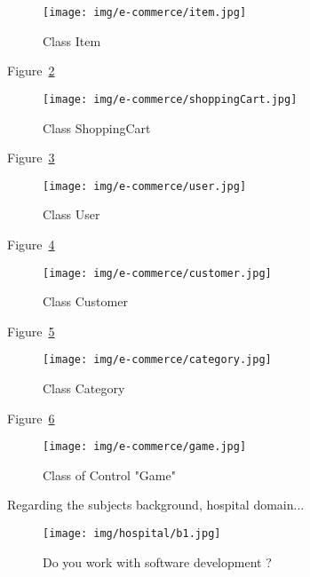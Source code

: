 \begin{figure}[!h]
\centering
\texttt{[image: img/e-commerce/item.jpg]}
\caption{Class Item}
\label{fig:e-commerceItem}
\end{figure}



Figure~\ref{fig:e-commerceShoppingCart}

\begin{figure}[!h]
\centering
\texttt{[image: img/e-commerce/shoppingCart.jpg]}
\caption{Class ShoppingCart}
\label{fig:e-commerceShoppingCart}
\end{figure}


Figure~\ref{fig:e-commerceUser}

\begin{figure}[!h]
\centering
\texttt{[image: img/e-commerce/user.jpg]}
\caption{Class User}
\label{fig:e-commerceUser}
\end{figure}


Figure~\ref{fig:e-commerceCustomer}

\begin{figure}[!h]
\centering
\texttt{[image: img/e-commerce/customer.jpg]}
\caption{Class Customer}
\label{fig:e-commerceCustomer}
\end{figure}


Figure~\ref{fig:e-commerceCategory}

\begin{figure}[!h]
\centering
\texttt{[image: img/e-commerce/category.jpg]}
\caption{Class Category}
\label{fig:e-commerceCategory}
\end{figure}


Figure~\ref{fig:e-commerceGame}

\begin{figure}[!h]
\centering
\texttt{[image: img/e-commerce/game.jpg]}
\caption{Class of Control "Game"}
\label{fig:e-commerceGame}
\end{figure}


Regarding the subjects background, hospital domain...




\begin{figure}[!h]
\centering
\texttt{[image: img/hospital/b1.jpg]}
\caption{Do you  work with software development ?}
\label{fig:backHospital-1}
\end{figure}







